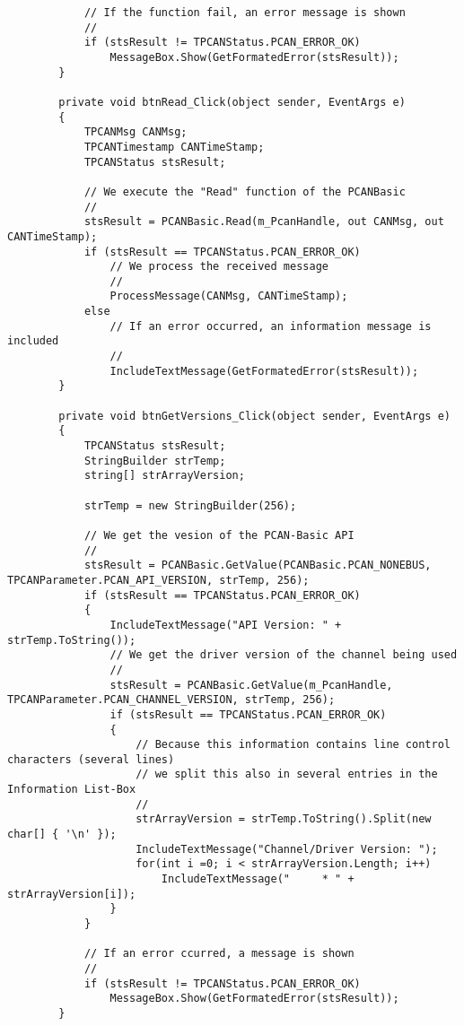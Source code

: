 \begin{lstlisting}
            // If the function fail, an error message is shown
            //
            if (stsResult != TPCANStatus.PCAN_ERROR_OK)
                MessageBox.Show(GetFormatedError(stsResult));
        }

        private void btnRead_Click(object sender, EventArgs e)
        {
            TPCANMsg CANMsg;
            TPCANTimestamp CANTimeStamp;
            TPCANStatus stsResult;

            // We execute the "Read" function of the PCANBasic
            //
            stsResult = PCANBasic.Read(m_PcanHandle, out CANMsg, out CANTimeStamp);
            if (stsResult == TPCANStatus.PCAN_ERROR_OK)
                // We process the received message
                //
                ProcessMessage(CANMsg, CANTimeStamp);
            else
                // If an error occurred, an information message is included
                //
                IncludeTextMessage(GetFormatedError(stsResult));
        }

        private void btnGetVersions_Click(object sender, EventArgs e)
        {
            TPCANStatus stsResult;
            StringBuilder strTemp;
            string[] strArrayVersion;

            strTemp = new StringBuilder(256);

            // We get the vesion of the PCAN-Basic API
            //
            stsResult = PCANBasic.GetValue(PCANBasic.PCAN_NONEBUS, TPCANParameter.PCAN_API_VERSION, strTemp, 256);
            if (stsResult == TPCANStatus.PCAN_ERROR_OK)
            {
                IncludeTextMessage("API Version: " + strTemp.ToString());
                // We get the driver version of the channel being used
                //
                stsResult = PCANBasic.GetValue(m_PcanHandle, TPCANParameter.PCAN_CHANNEL_VERSION, strTemp, 256);
                if (stsResult == TPCANStatus.PCAN_ERROR_OK)
                {
                    // Because this information contains line control characters (several lines)
                    // we split this also in several entries in the Information List-Box
                    //
                    strArrayVersion = strTemp.ToString().Split(new char[] { '\n' });
                    IncludeTextMessage("Channel/Driver Version: ");
                    for(int i =0; i < strArrayVersion.Length; i++)
                        IncludeTextMessage("     * " + strArrayVersion[i]);
                }
            }

            // If an error ccurred, a message is shown
            //
            if (stsResult != TPCANStatus.PCAN_ERROR_OK)
                MessageBox.Show(GetFormatedError(stsResult));
        }


\end{lstlisting}

